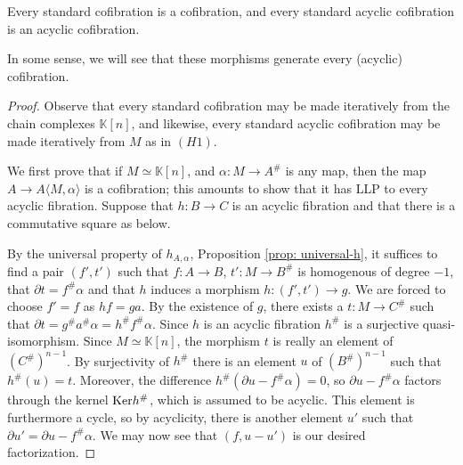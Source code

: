 \documentclass[../thesis.tex]{subfiles}
\begin{document}
            \begin{proposition}
                Every standard cofibration is a cofibration, and every standard acyclic cofibration is an acyclic cofibration.
            \end{proposition}

            \begin{remark}
                In some sense, we will see that these morphisms generate every (acyclic) cofibration.
            \end{remark}

            \begin{proof}
                Observe that every standard cofibration may be made iteratively from the chain complexes $\mathbb{K}[n]$, and likewise, every standard acyclic cofibration may be made iteratively from $M$ as in $(H1)$.

                We first prove that if $M \simeq \mathbb{K}[n]$, and $\alpha: M \rightarrow A^\#$ is any map, then the map $A \rightarrow A\langle M,\alpha\rangle$ is a cofibration; this amounts to show that it has LLP to every acyclic fibration. Suppose that $h: B \rightarrow C$ is an acyclic fibration and that there is a commutative square as below.
                \begin{center}
                \end{center}
                
                By the universal property of $h_{A,\alpha}$, Proposition \ref{prop: universal-h}, it suffices to find a pair $(f',t')$ such that $f: A \rightarrow B$, $t' : M \rightarrow B^\#$ is homogenous of degree $-1$, that $\partial t = f^\#\alpha$ and that $h$ induces a morphism $h : (f',t') \rightarrow g$. We are forced to choose $f' = f$ as $hf = ga$. By the existence of $g$, there exists a $t : M \rightarrow C^\#$ such that $\partial t = g^\#a^\#\alpha = h^\#f^\#\alpha$. Since $h$ is an acyclic fibration $h^\#$ is a surjective quasi-isomorphism. Since $M \simeq \mathbb{K}[n]$, the morphism $t$ is really an element of $(C^{\#})^{n-1}$. By surjectivity of $h^\#$ there is an element $u$ of $(B^{\#})^{n-1}$ such that $h^\#(u) = t$. Moreover, the difference $h^\#(\partial u - f^\#\alpha) = 0$, so $\partial u - f^\#\alpha$ factors through the kernel $\tt{Ker} h^\#$, which is assumed to be acyclic. This element is furthermore a cycle, so by acyclicity, there is another element $u'$ such that $\partial u' = \partial u - f^\#\alpha$. We may now see that $(f, u - u')$ is our desired factorization.
                

\end{proof}
\end{document}

